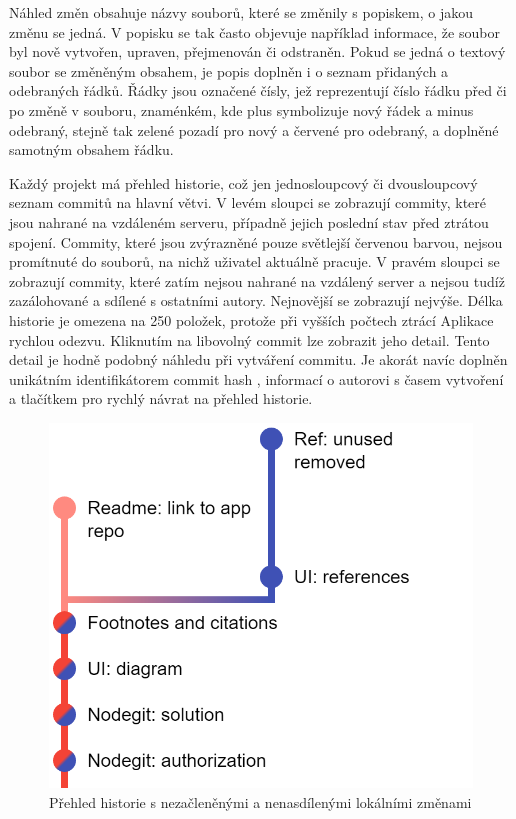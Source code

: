 Náhled změn obsahuje názvy souborů, které se změnily s popiskem, o jakou změnu se jedná. V popisku se tak často objevuje například informace, že soubor byl nově vytvořen, upraven, přejmenován či odstraněn. Pokud se jedná o textový soubor se změněným obsahem, je popis doplněn i o seznam přidaných a odebraných řádků. Řádky jsou označené čísly, jež reprezentují číslo řádku před či po změně v souboru, znaménkém, kde plus symbolizuje nový řádek a minus odebraný, stejně tak zelené pozadí pro nový a červené pro odebraný, a doplněné samotným obsahem řádku.

Každý projekt má přehled historie, což jen jednosloupcový či dvousloupcový seznam commitů na hlavní větvi. V levém sloupci se zobrazují commity, které jsou nahrané na vzdáleném serveru, případně jejich poslední stav před ztrátou spojení. Commity, které jsou zvýrazněné pouze světlejší červenou barvou, nejsou promítnuté do souborů, na nichž uživatel aktuálně pracuje. V pravém sloupci se zobrazují commity, které zatím nejsou nahrané na vzdálený server a nejsou tudíž zazálohované a sdílené s ostatními autory. Nejnovější se zobrazují nejvýše. Délka historie je omezena na 250 položek, protože při vyšších počtech ztrácí Aplikace rychlou odezvu. Kliknutím na libovolný commit lze zobrazit jeho detail. Tento detail je hodně podobný náhledu při vytváření commitu. Je akorát navíc doplněn unikátním identifikátorem commit hash \cite{commit-hash}, informací o autorovi s časem vytvoření a tlačítkem pro rychlý návrat na přehled historie.

\FloatBarrier
\begin{figure}[ht]
	\centering
	\includegraphics[scale=0.5]{sections/ui/images/history.png}
	\caption[Historie]{Přehled historie s nezačleněnými a nenasdílenými lokálními změnami}
	\label{fig:history}
\end{figure}
\FloatBarrier

